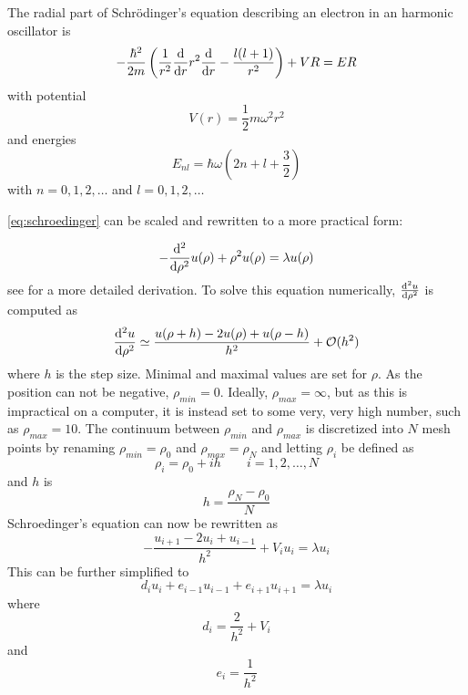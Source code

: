 \documentclass[aps,reprint]{revtex4-1}
\begin{document}
The radial part of Schrödinger's
equation describing an electron in an harmonic oscillator is
\begin{equation}
  \label{eq:schroedinger}
  -\frac{\hbar^{2}}{2m} \left( \frac{1}{r^{2}}\dv{r}r^{2}\dv{r} - \frac{l(l+1)}{r^{2}} \right) + VR = ER
\end{equation}
with potential
\begin{equation*}
  V(r) = \frac{1}{2}m\omega^{2}r^{2}
\end{equation*}
and energies
\begin{equation*}
  E_{nl} = \hbar\omega\left( 2n+l+\frac{3}{2} \right)
\end{equation*}
with \(n=0,1,2,\ldots\) and \(l = 0,1,2,\ldots\)

\eqref{eq:schroedinger} can be scaled and rewritten to a more practical form:

\begin{equation}
  \label{eq:scaledschroedinger}
  -\dv[2]{\rho}u(\rho)+\rho^{2}u(\rho) = \lambda u(\rho)
\end{equation}
see \cite{project2} for a more detailed derivation. To solve this equation numerically,
\(\dv[2]{u}{\rho}\) is computed as
\begin{equation*}
  \dv[2]{u}{\rho} \simeq \frac{u(\rho+h)-2u(\rho)+u(\rho-h)}{h^{2}} + \mathcal{O}(h^{2})
\end{equation*}
where \(h\) is the step size. Minimal and maximal values are set for \(\rho\).
As the position can not be negative, \(\rho_{min}=0\). Ideally,
\(\rho_{max}=\infty\), but as this is impractical on a computer, it is instead
set to some very, very high number, such as \(\rho_{max}=10\). The continuum between
\(\rho_{min}\) and \(\rho_{max}\) is discretized into \(N\) mesh points by
renaming \(\rho_{min}=\rho_{0}\) and \(\rho_{max}=\rho_{N}\) and letting
\(\rho_{i}\) be defined as
\begin{equation*}
  \rho_{i} = \rho_{0}+ih\qquad i=1,2,\ldots,N
\end{equation*}
and \(h\) is
\begin{equation*}
  h = \frac{\rho_{N}-\rho_{0}}{N}
\end{equation*}
Schroedinger's equation can now be rewritten as
\begin{equation*}
  - \frac{u_{i+1}-2u_{i}+u_{i-1}}{h^{2}} + V_{i}u_{i} = \lambda u_{i}
\end{equation*}
This can be further simplified to
\begin{equation*}
  d_{i}u_{i}+e_{i-1}u_{i-1}+e_{i+1}u_{i+1} = \lambda u_{i}
\end{equation*}
where
\begin{equation*}
  d_{i} = \frac{2}{h^{2}} + V_{i}
\end{equation*}
and
\begin{equation*}
  e_{i}= \frac{1}{h^{2}}
\end{equation*}
\end{document}
